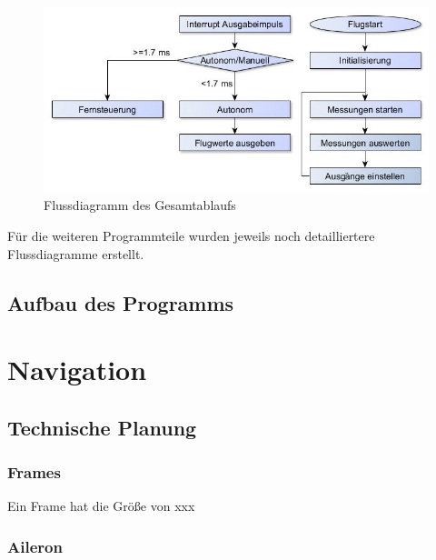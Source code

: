   \begin{figure}[tbh]
    \begin{centering}
      \includegraphics[width = \textwidth]{Bilder/Flussdiagramm}
    \par\end{centering}
    \caption{Flussdiagramm des Gesamtablaufs}
    \label{Flussdiragramm}
  \end{figure}

  Für die weiteren Programmteile wurden jeweils noch detailliertere Flussdiagramme erstellt.

  \subsection{Aufbau des Programms}






\section{Navigation}

  \subsection{Technische Planung}
  
    \subsubsection{Frames}


    Ein Frame hat die Größe von xxx

    \subsubsection{Aileron}

